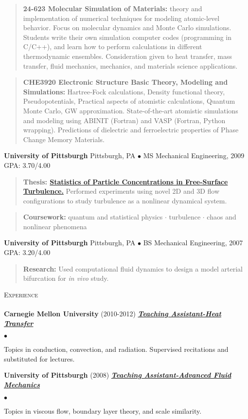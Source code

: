 \documentclass{article}
\newcommand{\area}[2]{\vspace*{-9pt} \begin{verse}\textbf{#1}   #2 \end{verse}  }
\newcommand{\lineunder}{\vspace*{-8pt} \\ \hspace*{-18pt} \hrulefill \\}
\newcommand{\header}[1]{{\hspace*{-15pt}\vspace*{6pt} \textsc{#1}} \vspace*{-6pt} \lineunder}
\newcommand{\employer}[3]{{ \textbf{#1} (#2) \underline{\textbf{\emph{#3}}}\\  }}
\newenvironment{achievements}{\begin{list}{$\bullet$}{\topsep 0pt \itemsep -2pt}}{\vspace*{4pt}\end{list}}
\newcommand{\schoolwithcourses}[3]{
 \textbf{#1} #2 $\bullet$ #3\\ 
\vspace*{5pt}
}
\begin{document}
\area{24-623 Molecular Simulation of Materials:} {theory and implementation of numerical techniques for modeling atomic-level behavior. Focus on molecular dynamics and Monte Carlo simulations. Students write their own simulation computer codes 
(programming in C/C++), and learn how to perform calculations in different thermodynamic ensembles. Consideration given to heat transfer, mass transfer, fluid mechanics, mechanics, and materials science applications.}

\area{CHE3920 Electronic Structure Basic Theory, 
Modeling and Simulations:} {
Hartree‐Fock calculations, Density functional theory, Pseudopotentials, 
Practical aspects of atomistic calculations, Quantum Monte Carlo, 
GW approximation. State‐of‐the‐art atomistic simulations and modeling using ABINIT (Fortran) and VASP (Fortran, Python wrapping). Predictions of dielectric and  ferroelectric 
properties of Phase Change Memory Materials.}

\schoolwithcourses{University of Pittsburgh}{Pittsburgh, PA}{MS Mechanical Engineering, 2009 GPA: 3.70/4.00}

\area{
Thesis: \href{http://jasonlarkin.github.io/projects-ms.html}
{Statistics of Particle Concentrations in Free-Surface Turbulence.}}
{Performed experiments using novel 2D and 3D flow configurations to study turbulence 
as a nonlinear dynamical system.}

\area{Coursework:}
{
quantum and statistical physics $\cdot$ turbulence $\cdot$ chaos and nonlinear phenomena
}

\schoolwithcourses{University of Pittsburgh}{Pittsburgh, PA}{BS Mechanical Engineering, 2007 GPA: 3.20/4.00}

\area{
Research: }
{Used computational fluid dynamics to design a model arterial bifurcation for \emph{in vivo} study.}

\header{Experience}

\employer{Carnegie Mellon University}{2010-2012}{Teaching Assistant-Heat Transfer}
	\begin{achievements}
	\item Topics in conduction, convection, and radiation. Supervised recitations and substituted for lectures. 
	\end{achievements}

\employer{University of Pittsburgh}{2008}{Teaching Assistant-Advanced Fluid Mechanics}
	\begin{achievements}
	\item Topics in viscous flow, boundary layer theory, and scale similarity. 
	\end{achievements}
\end{document}
